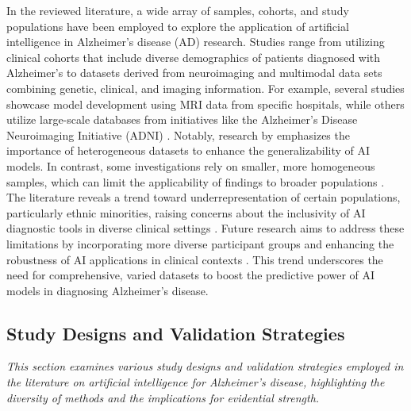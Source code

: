 \documentclass{MITcsail}
\begin{document}
In the reviewed literature, a wide array of samples, cohorts, and study populations have been employed to explore the application of artificial intelligence in Alzheimer's disease (AD) research. Studies range from utilizing clinical cohorts that include diverse demographics of patients diagnosed with Alzheimer's to datasets derived from neuroimaging and multimodal data sets combining genetic, clinical, and imaging information. For example, several studies showcase model development using MRI data from specific hospitals, while others utilize large-scale databases from initiatives like the Alzheimer's Disease Neuroimaging Initiative (ADNI) \citep{ref_10_1016_j_nicl_2021_102712}. Notably, research by \citet{ref_10_1016_j_neurobiolaging_2021_04_024} emphasizes the importance of heterogeneous datasets to enhance the generalizability of AI models. In contrast, some investigations rely on smaller, more homogeneous samples, which can limit the applicability of findings to broader populations \citep{ref_10_1016_j_neuroimage_2020_117203,ref_10_3390_brainsci10020084}. The literature reveals a trend toward underrepresentation of certain populations, particularly ethnic minorities, raising concerns about the inclusivity of AI diagnostic tools in diverse clinical settings \citep{ref_10_1002_alz_13390}. Future research aims to address these limitations by incorporating more diverse participant groups and enhancing the robustness of AI applications in clinical contexts \citep{ref_10_1016_j_ejrad_2023_110934}. This trend underscores the need for comprehensive, varied datasets to boost the predictive power of AI models in diagnosing Alzheimer's disease.

\subsection{Study Designs and Validation Strategies}

\textit{This section examines various study designs and validation strategies employed in the literature on artificial intelligence for Alzheimer's disease, highlighting the diversity of methods and the implications for evidential strength.}
\end{document}
